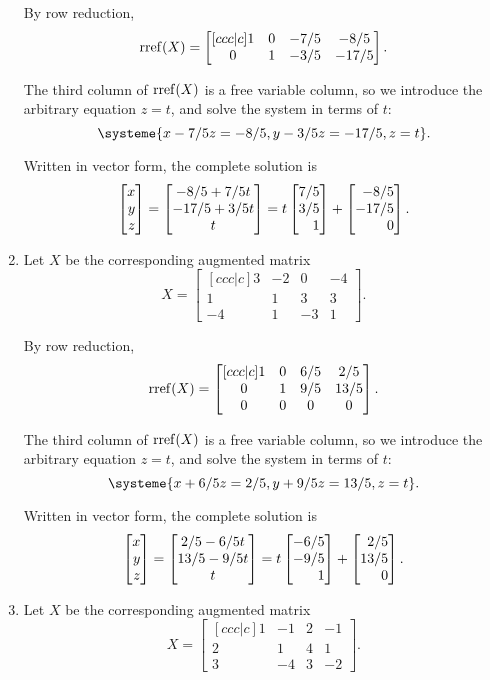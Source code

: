 \begin{exercises}
\begin{problist}
\begin{solution}
\begin{enumerate}
				By row reduction,
				\[
					\operatorname{rref}(X)=
					\begin{bmatrix}[ccc|c]
						1 & 0 & -7/5 & -8/5\\
						0 & 1 & -3/5 & -17/5
					\end{bmatrix}.
				\]
				
				The third column of $\operatorname{rref}(X)$ is a free variable column, so we introduce the arbitrary equation $z=t$, and solve the system in terms of $t$:
				\[
					\systeme{x-7/5z=-8/5,y-3/5z=-17/5,z=t}.
				\]
				
				Written in vector form, the complete solution is
				\[
					\mat{x\\y\\z} = \matc{-8/5+7/5t\\-17/5+3/5t\\t} = t\mat{7/5\\3/5\\1}+\mat{-8/5\\-17/5\\0}.
				\]
				\item 
				Let $X$ be the corresponding augmented matrix
				\[
					X=
					\begin{bmatrix}[ccc|c]
						3 & -2 & 0 & -4\\
						1 & 1 & 3 & 3\\
						-4 & 1 & -3 & 1
					\end{bmatrix}.
				\]
				
				By row reduction,
				\[
					\operatorname{rref}(X)=
					\begin{bmatrix}[ccc|c]
						1 & 0 & 6/5 & 2/5\\
						0 & 1 & 9/5 & 13/5\\
						0 & 0 & 0 & 0
					\end{bmatrix}.
				\]
				
				The third column of $\operatorname{rref}(X)$ is a free variable column, so we introduce the arbitrary equation $z=t$, and solve the system in terms of $t$:
				\[
					\systeme{x+6/5z=2/5,y+9/5z=13/5,z=t}.
				\]
				
				Written in vector form, the complete solution is
				\[
					\mat{x\\y\\z} = \matc{2/5-6/5t\\13/5-9/5t\\t} = t\mat{-6/5\\-9/5\\1}+\mat{2/5\\13/5\\0}.
				\]
				\item 
				Let $X$ be the corresponding augmented matrix
				\[
					X=
					\begin{bmatrix}[ccc|c]
						1 & -1 & 2 & -1\\
						2 & 1 & 4 & 1\\
						3 & -4 & 3 & -2
					\end{bmatrix}.
				\]
				

\end{enumerate}
\end{solution}
\end{problist}
\end{exercises}
